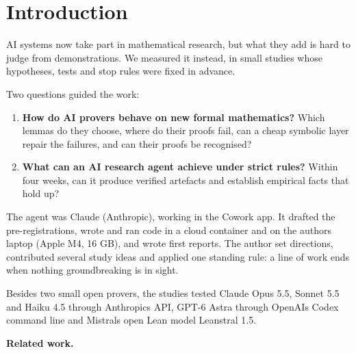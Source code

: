 \documentclass[11pt,a4paper]{article}
\providecommand{\tightlist}{\setlength{\itemsep}{0pt}\setlength{\parskip}{0pt}}
\begin{document}
\section{Introduction}

AI systems now take part in mathematical research, but what they add is hard to judge from demonstrations. We measured it instead, in small studies whose hypotheses, tests and stop rules were fixed in advance.

Two questions guided the work:

\begin{enumerate}
\def\labelenumi{\arabic{enumi}.}
\tightlist
\item
  \textbf{How do AI provers behave on new formal mathematics?} Which lemmas do they choose, where do their proofs fail, can a cheap symbolic layer repair the failures, and can their proofs be recognised?
\item
  \textbf{What can an AI research agent achieve under strict rules?} Within four weeks, can it produce verified artefacts and establish empirical facts that hold up?
\end{enumerate}

The agent was Claude (Anthropic), working in the Cowork app. It drafted the pre-registrations, wrote and ran code in a cloud container and on the author\textquotesingle s laptop (Apple M4, 16 GB), and wrote first reports. The author set directions, contributed several study ideas and applied one standing rule: a line of work ends when nothing groundbreaking is in sight.

Besides two small open provers, the studies tested Claude Opus 5.5, Sonnet 5.5 and Haiku 4.5 through Anthropic\textquotesingle s API, GPT-6 Astra through OpenAI\textquotesingle s Codex command line and Mistral\textquotesingle s open Lean model Leanstral 1.5.

\textbf{Related work.}
\end{document}
